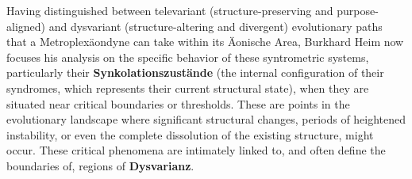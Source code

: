 \documentclass[12pt]{article}
\begin{document}
Having distinguished between televariant (structure-preserving and purpose-aligned) and dysvariant (structure-altering and divergent) evolutionary paths that a Metroplexäondyne can take within its Äonische Area, Burkhard Heim now focuses his analysis on the specific behavior of these syntrometric systems, particularly their \textbf{Synkolationszustände} (the internal configuration of their syndromes, which represents their current structural state), when they are situated near critical boundaries or thresholds. These are points in the evolutionary landscape where significant structural changes, periods of heightened instability, or even the complete dissolution of the existing structure, might occur. These critical phenomena are intimately linked to, and often define the boundaries of, regions of \textbf{Dysvarianz}.
\end{document}
